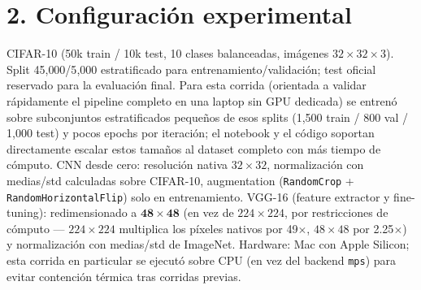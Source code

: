 \documentclass[9pt]{article}
\begin{document}
\section*{2. Configuración experimental}
\footnotesize
CIFAR-10 (50k train / 10k test, 10 clases balanceadas, imágenes $32\times32\times3$). Split
45{,}000/5{,}000 estratificado para entrenamiento/validación; test oficial reservado para la
evaluación final. Para esta corrida (orientada a validar rápidamente el pipeline completo en una
laptop sin GPU dedicada) se entrenó sobre subconjuntos estratificados pequeños de esos splits
(1{,}500 train / 800 val / 1{,}000 test) y pocos epochs por iteración; el notebook y el código
soportan directamente escalar estos tamaños al dataset completo con más tiempo de cómputo. CNN
desde cero: resolución nativa $32\times32$, normalización con medias/std calculadas sobre
CIFAR-10, augmentation (\texttt{RandomCrop} + \texttt{RandomHorizontalFlip}) solo en entrenamiento.
VGG-16 (feature extractor y fine-tuning): redimensionado a $\mathbf{48\times48}$ (en vez de
$224\times224$, por restricciones de cómputo --- $224\times224$ multiplica los píxeles nativos por
49$\times$, $48\times48$ por 2.25$\times$) y normalización con medias/std de ImageNet. Hardware:
Mac con Apple Silicon; esta corrida en particular se ejecutó sobre CPU (en vez del backend
\texttt{mps}) para evitar contención térmica tras corridas previas.
\end{document}
